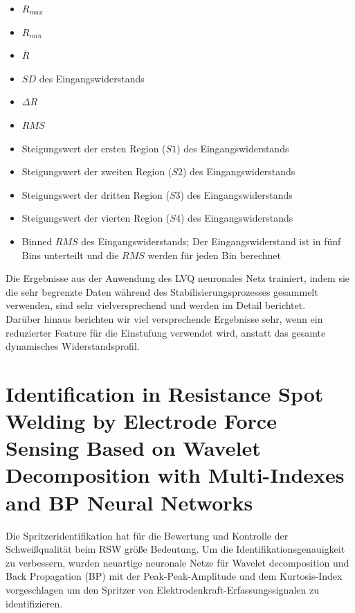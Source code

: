 \documentclass[english,ngerman]{tudscrreprt}
\begin{document}
\begin{itemize}
\item $R_{max}$
\item $R_{min}$
\item $\bar R$
\item $SD$ des Eingangswiderstands
\item $\Delta R$
\item $RMS$
\item Steigungswert der ersten Region ($S1$) des Eingangswiderstands
\item Steigungswert der zweiten Region ($S2$) des Eingangswiderstands
\item Steigungswert der dritten Region ($S3$) des Eingangswiderstands
\item Steigungswert der vierten Region ($S4$) des Eingangswiderstands
\item Binned $RMS$ des Eingangswiderstands; Der Eingangswiderstand ist in fünf Bins unterteilt und die $RMS$ werden für jeden Bin berechnet
\end{itemize}

Die Ergebnisse aus der Anwendung des LVQ neuronales Netz trainiert, indem sie die sehr begrenzte Daten während des Stabilisierungsprozesses gesammelt verwenden, sind sehr vielversprechend und werden im Detail berichtet.\\
Darüber hinaus berichten wir viel versprechende Ergebnisse sehr, wenn ein reduzierter Feature für die Einstufung verwendet wird, anstatt das gesamte dynamisches Widerstandsprofil.
\newpage

\section{Identification in Resistance Spot Welding by Electrode Force Sensing Based on Wavelet Decomposition with Multi-Indexes and BP Neural Networks\cite{Chen.2019}}
Die Spritzeridentifikation hat für die Bewertung und Kontrolle der Schweißqualität beim RSW größe Bedeutung. Um die Identifikationsgenauigkeit zu verbessern, wurden neuartige neuronale Netze für Wavelet decomposition und Back Propagation (BP) mit der Peak-Peak-Amplitude und dem Kurtosis-Index vorgeschlagen um den Spritzer von Elektrodenkraft-Erfassungssignalen zu identifizieren.
\end{document}
